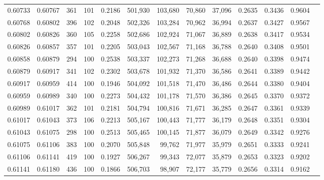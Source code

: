 \begin{tabular}{rrrrrrrrrrrrr}
0.60733 & 0.60767 &   361 & 101 &                                     0.2186 & 501,930 & 103,680 &  70,860 &  37,096 & 0.2635 & 0.3436 & 0.9604 \\
0.60768 & 0.60802 &   396 & 102 &                                     0.2048 & 502,326 & 103,284 &  70,962 &  36,994 & 0.2637 & 0.3427 & 0.9567 \\
0.60802 & 0.60826 &   360 & 105 &                                     0.2258 & 502,686 & 102,924 &  71,067 &  36,889 & 0.2638 & 0.3417 & 0.9534 \\
0.60826 & 0.60857 &   357 & 101 &                                     0.2205 & 503,043 & 102,567 &  71,168 &  36,788 & 0.2640 & 0.3408 & 0.9501 \\
0.60858 & 0.60879 &   294 & 100 &                                     0.2538 & 503,337 & 102,273 &  71,268 &  36,688 & 0.2640 & 0.3398 & 0.9474 \\
0.60879 & 0.60917 &   341 & 102 &                                     0.2302 & 503,678 & 101,932 &  71,370 &  36,586 & 0.2641 & 0.3389 & 0.9442 \\
0.60917 & 0.60959 &   414 & 100 &                                     0.1946 & 504,092 & 101,518 &  71,470 &  36,486 & 0.2644 & 0.3380 & 0.9404 \\
0.60959 & 0.60989 &   340 & 100 &                                     0.2273 & 504,432 & 101,178 &  71,570 &  36,386 & 0.2645 & 0.3370 & 0.9372 \\
0.60989 & 0.61017 &   362 & 101 &                                     0.2181 & 504,794 & 100,816 &  71,671 &  36,285 & 0.2647 & 0.3361 & 0.9339 \\
0.61017 & 0.61043 &   373 & 106 &                                     0.2213 & 505,167 & 100,443 &  71,777 &  36,179 & 0.2648 & 0.3351 & 0.9304 \\
0.61043 & 0.61075 &   298 & 100 &                                     0.2513 & 505,465 & 100,145 &  71,877 &  36,079 & 0.2649 & 0.3342 & 0.9276 \\
0.61075 & 0.61106 &   383 & 100 &                                     0.2070 & 505,848 &  99,762 &  71,977 &  35,979 & 0.2651 & 0.3333 & 0.9241 \\
0.61106 & 0.61141 &   419 & 100 &                                     0.1927 & 506,267 &  99,343 &  72,077 &  35,879 & 0.2653 & 0.3323 & 0.9202 \\
0.61141 & 0.61180 &   436 & 100 &                                     0.1866 & 506,703 &  98,907 &  72,177 &  35,779 & 0.2656 & 0.3314 & 0.9162 \\

\end{tabular}
